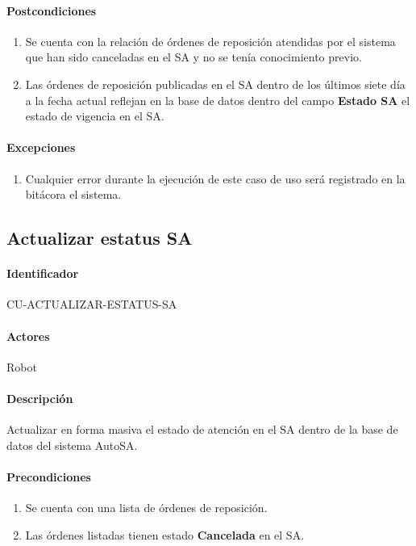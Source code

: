 \paragraph*{Postcondiciones}
\begin{enumerate}
  \item Se cuenta con la relación de órdenes de reposición atendidas por el sistema que han sido canceladas en el SA y no se tenía conocimiento previo.
  \item Las órdenes de reposición publicadas en el SA dentro de los últimos siete día a la fecha actual reflejan en la base de datos dentro del campo \textbf{Estado SA} el estado de vigencia en el SA.
\end{enumerate}
\paragraph*{Excepciones}
\begin{enumerate}
  \item Cualquier error durante la ejecución de este caso de uso será registrado en la bitácora el sistema.
\end{enumerate}


\subsection{Actualizar estatus SA}
\paragraph*{Identificador}
CU-ACTUALIZAR-ESTATUS-SA
\paragraph*{Actores}
Robot
\paragraph*{Descripción}
Actualizar en forma masiva el estado de atención en el SA dentro de la base de datos del sistema AutoSA.
\paragraph*{Precondiciones}
\begin{enumerate}
  \item Se cuenta con una lista de órdenes de reposición.
  \item Las órdenes listadas tienen estado \textbf{Cancelada} en el SA. 
\end{enumerate}
